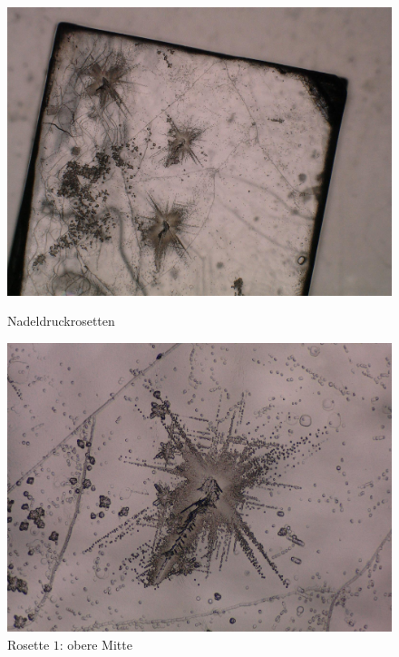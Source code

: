 \documentclass[12pt,a4paper]{scrartcl}
\numberwithin{equation}{section} %
\begin{document}
\begin{figure}[ht]
	\begin{minipage}[t]{.5\linewidth}
		\includegraphics[width=\textwidth]{../media/B2.8/Rosetten_uebersicht.pdf}
		\caption{Nadeldruckrosetten}
		\label{abb:Rosetten all}
	\end{minipage}
	\begin{minipage}[t]{.5\linewidth}
		\includegraphics[width=\textwidth]{../media/B2.8/Rosetten_1.pdf}
		\caption{Rosette $1$: obere Mitte }
		\label{abb:Rosetten 1}
	\end{minipage}
	

\end{figure}
\end{document}
